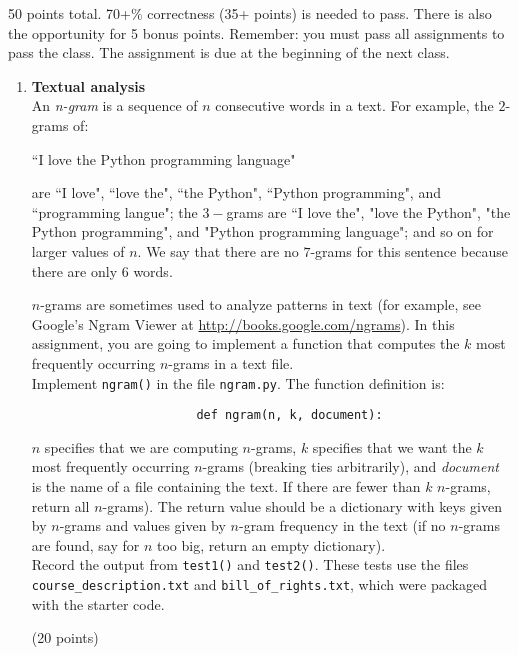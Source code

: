 \documentclass{article}
\newcounter{points}
\newcommand\setpoints[1]{\addtocounter{points}{#1}(#1 points)}
\begin{document}
\pagestyle{fancy}

50 points total.  70+\% correctness (35+ points) is needed to pass.  There is also the opportunity for 5 bonus points.  Remember: you must pass all assignments to pass the class.  The assignment is due at the beginning of the next class.

\begin{enumerate}
\item \textbf{Textual analysis} \\
An \emph{n-gram} is a sequence of $n$ consecutive words in a text.  For example, the $2$-grams of:
\begin{center}
 ``I love the Python programming language"
\end{center} are ``I love", ``love the", ``the Python", ``Python programming", and ``programming langue";  the $3-$grams are ``I love the", "love the Python", "the Python programming", and "Python programming language"; and so on for larger values of $n$.  We say that there are no $7$-grams for this sentence because there are only $6$ words.

$n$-grams are sometimes used to analyze patterns in text (for example, see Google's Ngram Viewer at \url{http://books.google.com/ngrams}).  In this assignment, you are going to implement a function that computes the $k$ most frequently occurring $n$-grams in a text file. \\

Implement \texttt{ngram()} in the file \texttt{ngram.py}.  The function definition is: \\

\begin{lstlisting}
                       def ngram(n, k, document):
\end{lstlisting}
$n$ specifies that we are computing $n$-grams, $k$ specifies that we want the $k$ most frequently occurring $n$-grams (breaking ties arbitrarily), and \emph{document} is the name of a file containing the text.  If there are fewer than $k$ $n$-grams, return all $n$-grams).  The return value should be a dictionary with keys given by $n$-grams and values given by $n$-gram frequency in the text  (if no $n$-grams are found, say for $n$ too big, return an empty dictionary).  \\

Record the output from \texttt{test1()} and \texttt{test2()}.  These tests use the files \texttt{course\_description.txt} and \texttt{bill\_of\_rights.txt}, which were packaged with the starter code. \setpoints{20} \\


\end{enumerate}
\end{document}
